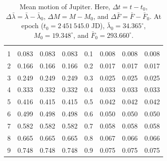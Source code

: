 \begin{table}[!h]
\begin{tabular}{rrrr|rrrr}
&&&&&&&\\
1 &   0.083 &   0.083 &   0.083 & 0.1 &   0.008 &   0.008 &   0.008\\
2 &   0.166 &   0.166 &   0.166 & 0.2 &   0.017 &   0.017 &   0.017\\
3 &   0.249 &   0.249 &   0.249 & 0.3 &   0.025 &   0.025 &   0.025\\
4 &   0.333 &   0.332 &   0.332 & 0.4 &   0.033 &   0.033 &   0.033\\
5 &   0.416 &   0.415 &   0.415 & 0.5 &   0.042 &   0.042 &   0.042\\
6 &   0.499 &   0.498 &   0.498 & 0.6 &   0.050 &   0.050 &   0.050\\
7 &   0.582 &   0.582 &   0.582 & 0.7 &   0.058 &   0.058 &   0.058\\
8 &   0.665 &   0.665 &   0.665 & 0.8 &   0.067 &   0.066 &   0.066\\
9 &   0.748 &   0.748 &   0.748 & 0.9 &   0.075 &   0.075 &   0.075\\
\end{tabular}
\caption{Mean motion of Jupiter.  Here, $\Delta t = t-t_0$, $\Delta\bar{\lambda} = \bar{\lambda}-\bar{\lambda}_0$, $\Delta M = M - M_0$, and $\Delta\bar{F} = \bar{F} - \bar{F}_0$. At epoch  ($t_0 = 2\,451\,545.0$ JD), $\bar{\lambda}_0 = 34.365^\circ$,  $M_0 = 19.348^\circ$, and $\bar{F}_0=293.660^\circ$. }\label{vt11}
\end{table}

